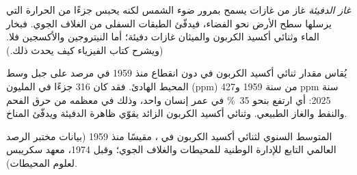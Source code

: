 \begin{definition}\label{def:g8:combustion-and-fuels:greenhouse}
\emph{غاز الدفيئة} غاز من غازات  يسمح بمرور ضوء
الشمس لكنه يحبس جزءًا من الحرارة التي يرسلها سطح الأرض نحو الفضاء، فيدفّئ
الطبقات السفلى من الغلاف الجوي. فبخار الماء وثنائي أكسيد الكربون والميثان
غازات دفيئة؛ أما النيتروجين والأكسجين فلا. (ويشرح كتاب الفيزياء كيف يحدث
ذلك.)
\end{definition}

\begin{proposition}\label{prop:g8:combustion-and-fuels:rising}
يُقاس مقدار ثنائي أكسيد الكربون في  دون انقطاع منذ 1959 في مرصد على
جبل وسط المحيط الهادئ. فقد كان 316 جزءًا في المليون (ppm) من  سنة
1959 و427 ppm سنة 2025: أي ارتفع بنحو \qty{35}{\percent} في عمر إنسان
واحد، وذلك في معظمه من حرق الفحم والنفط والغاز الطبيعي. وثنائي أكسيد
الكربون الزائد يقوّي ظاهرة الدفيئة ويدفّئ المناخ.
\end{proposition}

\begin{omfigure}

{\small المتوسط السنوي لثنائي أكسيد الكربون في ، مقيسًا منذ 1959
(بيانات مختبر الرصد العالمي التابع للإدارة الوطنية للمحيطات والغلاف الجوي؛
وقبل 1974، معهد سكريبس لعلوم المحيطات).}
\end{omfigure}

